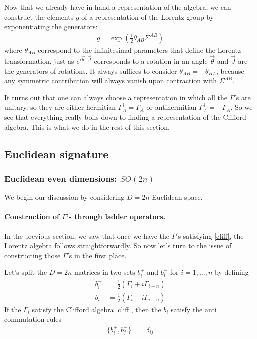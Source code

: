 \documentclass[a4paper,12pt]{article}
\numberwithin{equation}{section}
\numberwithin{exe}{section}
\renewcommand{\dag}{{\dagger}}
\newcommand{\G}{{\Gamma}}
\begin{document}
Now that we already have in hand a representation of the algebra, we can construct the elements $g$ of a representation of the Lorentz group by exponentiating the generators:
	\begin{align}\label{}
	g=\exp\left( \frac{1}{2}\theta_{AB}\Sigma^{AB} \right)
	\end{align}
where $\theta_{AB}$ correspond to the infinitesimal parameters that define the Lorentz transformation, just as $e^{i \vec{\theta} \cdot \vec{J}}$ corresponds to a rotation in an angle $\vec{\theta}$ and $\vec{J}$ are the generators of rotations.  It always suffices to consider $\theta_{AB}=-\theta_{BA}$, because any symmetric contribution will always vanish upon contraction with $\Sigma^{AB}$.

It turns out that one can always choose a representation in which all the $\G'$s are unitary, so they are either hermitian $\G_A^\dag=\G_A$ or antihermitian $\G_A^\dag=-\G_A$. So we see that everything really boils down to finding a representation of the Clifford algebra. This is what we do in the rest of this section.

\subsection{Euclidean signature}

\subsubsection{Euclidean even dimensions: $SO(2n)$}\label{euceven}

We begin our discussion by considering $D=2n$ Euclidean space.  

\paragraph{Construction of $\G$'s through ladder operators.} In the previous section, we saw that once we have the $\G'$s satisfying \eqref{cliff}, the Lorentz algebra follows straightforwardly. So now let's turn to the issue of constructing those $\G'$s in the first place.

Let's split the $D=2n$ matrices in two sets $b_i^+$ and $b_i^-$ for $i=1,\hdots,n$ by defining
	\begin{align}\label{bi}
	b_i^+ &=\frac{1}{2} \left( \G_i + i \G_{i+n} \right)  \\
	b_i^- &=  \frac{1}{2} \left( \G_i - i \G_{i+n}  \right)
	\end{align}
If the $\G_i$ satisfy the Clifford algebra \eqref{cliff}, then the $b_i$ satisfy the anti commutation rules 
	\begin{align}\label{bb}
	\{ b_i^+,b_j^- \}&=\delta_{ij}
	\end{align}
\end{document}
